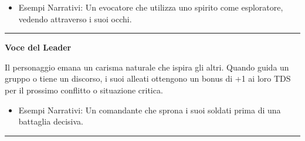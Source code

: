 \documentclass[../manuale_main.tex]{subfiles}
\begin{document}
\begin{itemize}
\item Esempi Narrativi: Un evocatore che utilizza uno spirito come esploratore, vedendo attraverso i suoi occhi.
\end{itemize}

\vspace{0.5cm}
\noindent
\begin{center}
\rule{\textwidth}{0.4pt} 
\end{center}
\vspace{0.5cm}

\begin{center}
\textbf{\large{Voce del Leader}}\\
\end{center}
Il personaggio emana un carisma naturale che ispira gli altri. Quando guida un gruppo o tiene un discorso, i suoi alleati ottengono un bonus di +1 ai loro TDS per il prossimo conflitto o situazione critica.

\begin{itemize}
\item Esempi Narrativi: Un comandante che sprona i suoi soldati prima di una battaglia decisiva.
\end{itemize}

\vspace{0.5cm}
\noindent
\begin{center}
\rule{\textwidth}{0.4pt} 
\end{center}
\vspace{0.5cm}
\end{document}
